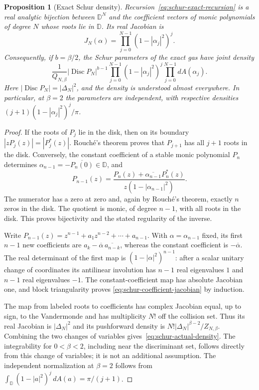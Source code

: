 \documentclass[11pt,a4paper]{article}
\numberwithin{equation}{section}
\newtheorem{proposition}[theorem]{Proposition}
\theoremstyle{definition}
\theoremstyle{remark}
\begin{document}
\begin{proposition}[Exact Schur density]
\label{prop:schur-exact-density}
Recursion~\eqref{eq:schur-exact-recursion} is a real analytic
bijection between $\mathbb D^N$ and the coefficient vectors of monic
polynomials of degree $N$ whose roots lie in $\mathbb D$. Its real
Jacobian is
\begin{equation}
 J_N(\alpha)=\prod_{j=0}^{N-1}(1-|\alpha_j|^2)^j.
 \label{eq:schur-coefficient-jacobian}
\end{equation}
Consequently, if $b=\beta/2$, the Schur parameters of the exact gas have
joint density
\begin{equation}
 \frac{1}{Q_{N,\beta}}
 |\operatorname{Disc}P_N|^{b-1}
 \prod_{j=0}^{N-1}(1-|\alpha_j|^2)^j
 \prod_{j=0}^{N-1}dA(\alpha_j).
 \label{eq:schur-actual-density}
\end{equation}
Here $|\operatorname{Disc}P_N|=|\Delta_N|^2$, and the density is understood
almost everywhere. In particular, at $\beta=2$ the parameters are
independent, with respective densities
$(j+1)(1-|\alpha_j|^2)^j/\pi$.
\end{proposition}

\begin{proof}
If the roots of $P_j$ lie in the disk, then on its boundary
$|zP_j(z)|=|P_j^*(z)|$. Rouch\'e's theorem proves that $P_{j+1}$ has all
$j+1$ roots in the disk. Conversely, the constant coefficient of a
stable monic polynomial $P_n$ determines
$\alpha_{n-1}=-\overline{P_n(0)}\in\mathbb D$, and
\[
 P_{n-1}(z)=\frac{P_n(z)+\overline{\alpha_{n-1}}P_n^*(z)}
                   {z(1-|\alpha_{n-1}|^2)}.
\]
The numerator has a zero at zero and, again by Rouch\'e's theorem,
exactly $n$ zeros in the disk. The quotient is monic, of degree $n-1$,
with all roots in the disk. This proves bijectivity and the stated
regularity of the inverse.

Write $P_{n-1}(z)=z^{n-1}+a_1z^{n-2}+\cdots+a_{n-1}$. With
$\alpha=\alpha_{n-1}$ fixed, its first $n-1$ new coefficients are
$a_k-\overline\alpha\,\overline{a_{n-k}}$, whereas the constant
coefficient is $-\overline\alpha$. The real determinant of the first
map is $(1-|\alpha|^2)^{n-1}$: after a scalar unitary change of
coordinates its antilinear involution has $n-1$ real eigenvalues $1$
and $n-1$ real eigenvalues $-1$. The constant-coefficient map has
absolute Jacobian one, and block triangularity proves
\eqref{eq:schur-coefficient-jacobian} by induction.

The map from labeled roots to coefficients has complex Jacobian equal,
up to sign, to the Vandermonde and has multiplicity $N!$ off the
collision set. Thus its real Jacobian is $|\Delta_N|^2$ and its
pushforward density is
$N!|\Delta_N|^{\beta-2}/Z_{N,\beta}$. Combining the two changes of
variables gives~\eqref{eq:schur-actual-density}. The integrability for
$0<\beta<2$, including near the discriminant set, follows directly
from this change of variables; it is not an additional assumption.
The independent normalization at $\beta=2$ follows from
$\int_{\mathbb D}(1-|a|^2)^j\,dA(a)=\pi/(j+1)$.
\end{proof}
\end{document}
